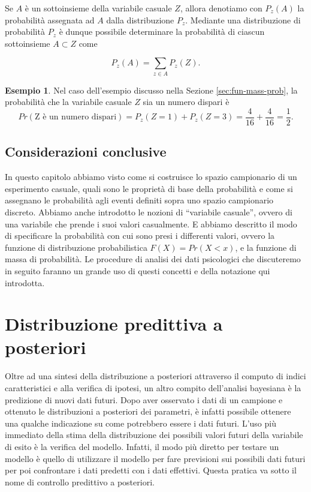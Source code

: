 \documentclass[
  11pt,
]{krantz}
\theoremstyle{definition}
\theoremstyle{definition}
\newtheorem{example}{Esempio}[chapter]
\theoremstyle{definition}
\theoremstyle{definition}
\theoremstyle{remark}
\begin{document}
Se \(A\) è un sottoinsieme della variabile casuale \(Z\), allora denotiamo con \(P_{z}(A)\) la probabilità assegnata ad \(A\) dalla distribuzione \(P_{z}\). Mediante una distribuzione di probabilità \(P_{z}\) è dunque possibile determinare la probabilità di ciascun sottoinsieme \(A \subset Z\) come

\[
P_{z}(A) = \sum_{z \in A} P_{z}(Z).
\]

\begin{example}
Nel caso dell'esempio discusso nella Sezione \ref{sec:fun-mass-prob}, la probabilità che la variabile casuale \(Z\) sia un numero dispari è \[
Pr(\text{Z è un numero dispari}) = P_{z}(Z = 1) + P_{z}(Z = 3) = \frac{4}{16} + \frac{4}{16} = \frac{1}{2}.
\]
\end{example}

\hypertarget{considerazioni-conclusive}{%
\section*{Considerazioni conclusive}\label{considerazioni-conclusive}}


In questo capitolo abbiamo visto come si costruisce lo spazio campionario di un esperimento casuale, quali sono le proprietà di base della probabilità e come si assegnano le probabilità agli eventi definiti sopra uno spazio campionario discreto. Abbiamo anche introdotto le nozioni di ``variabile casuale'', ovvero di una variabile che prende i suoi valori casualmente. E abbiamo descritto il modo di specificare la probabilità con cui sono presi i differenti valori, ovvero la funzione di distribuzione probabilistica \(F(X) = Pr(X < x)\), e la funzione di massa di probabilità. Le procedure di analisi dei dati psicologici che discuteremo in seguito faranno un grande uso di questi concetti e della notazione qui introdotta.

\hypertarget{chapter-ppc}{%
\chapter{Distribuzione predittiva a posteriori}\label{chapter-ppc}}

Oltre ad una sintesi della distribuzione a posteriori attraverso il computo di indici caratteristici e alla verifica di ipotesi, un altro compito dell'analisi bayesiana è la predizione di nuovi dati futuri. Dopo aver osservato i dati di un campione e ottenuto le distribuzioni a posteriori dei parametri, è infatti possibile ottenere una qualche indicazione su come potrebbero essere i dati futuri. L'uso più immediato della stima della distribuzione dei possibili valori futuri della variabile di esito è la verifica del modello. Infatti, il modo più diretto per testare un modello è quello di utilizzare il modello per fare previsioni sui possibili dati futuri per poi confrontare i dati predetti con i dati effettivi. Questa pratica va sotto il nome di controllo predittivo a posteriori.
\end{document}
